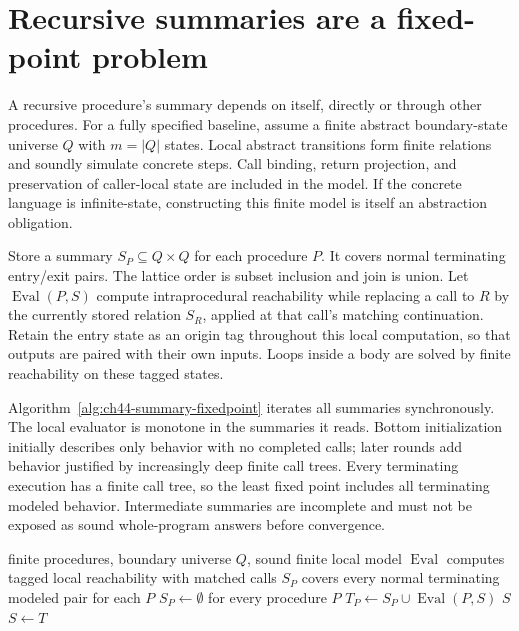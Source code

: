 \section{Recursive summaries are a fixed-point problem}
\label{sec:ch44-recursion}

A recursive procedure's summary depends on itself, directly or through other procedures.
For a fully specified baseline, assume a finite abstract boundary-state universe $Q$ with $m=|Q|$ states.
Local abstract transitions form finite relations and soundly simulate concrete steps.
Call binding, return projection, and preservation of caller-local state are included in the model.
If the concrete language is infinite-state, constructing this finite model is itself an abstraction obligation.

Store a summary $S_P\subseteq Q\times Q$ for each procedure $P$.
It covers normal terminating entry/exit pairs.
The lattice order is subset inclusion and join is union.
Let $\operatorname{Eval}(P,S)$ compute intraprocedural reachability while replacing a call to $R$ by the currently stored relation $S_R$, applied at that call's matching continuation.
Retain the entry state as an origin tag throughout this local computation, so that outputs are paired with their own inputs.
Loops inside a body are solved by finite reachability on these tagged states.

Algorithm~\ref{alg:ch44-summary-fixedpoint} iterates all summaries synchronously.
The local evaluator is monotone in the summaries it reads.
Bottom initialization initially describes only behavior with no completed calls; later rounds add behavior justified by increasingly deep finite call trees.
Every terminating execution has a finite call tree, so the least fixed point includes all terminating modeled behavior.
Intermediate summaries are incomplete and must not be exposed as sound whole-program answers before convergence.

\begin{algorithm}
\caption{Compute finite relational summaries for mutually recursive procedures.}
\label{alg:ch44-summary-fixedpoint}
\begin{pseudocode}
\Require finite procedures, boundary universe $Q$, sound finite local model
\Require $\operatorname{Eval}$ computes tagged local reachability with matched calls
\Ensure $S_P$ covers every normal terminating modeled pair for each $P$
\State $S_P\gets\emptyset$ for every procedure $P$
\Loop
    \State $T_P\gets S_P\cup\operatorname{Eval}(P,S)$
  \EndFor
    \State \Return $S$
  \EndIf
  \State $S\gets T$
\EndLoop
\end{pseudocode}
\end{algorithm}

